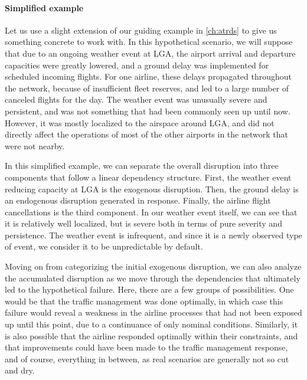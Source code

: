 \paragraph{Simplified example} Let us use a slight extension of our guiding example in \cref{ch:atrds} to give us something concrete to work with. In this hypothetical scenario, we will suppose that due to an ongoing weather event at LGA, the airport arrival and departure capacities were greatly lowered, and a ground delay was implemented for scheduled incoming flights. For one airline, these delays propagated throughout the network, because of insufficient fleet reserves, and led to a large number of canceled flights for the day. The weather event was unusually severe and persistent, and was not something that had been commonly seen up until now. However, it was mostly localized to the airspace around LGA, and did not directly affect the operations of most of the other airports in the network that were not nearby.

In this simplified example, we can separate the overall disruption into three components that follow a linear dependency structure. First, the weather event reducing capacity at LGA is the exogenous disruption. Then, the ground delay is an endogenous disruption generated in response. Finally, the airline flight cancellations is the third component. In our weather event itself, we can see that it is relatively well localized, but is severe both in terms of pure severity and persistence. The weather event is infrequent, and since it is a newly observed type of event, we consider it to be unpredictable by default. 

Moving on from categorizing the initial exogenous disruption, we can also analyze the accumulated disruption as we move through the dependencies that ultimately led to the hypothetical failure. Here, there are a few groups of possibilities. One would be that the traffic management was done optimally, in which case this failure would reveal a weakness in the airline processes that had not been exposed up until this point, due to a continuance of only nominal conditions. Similarly, it is also possible that the airline responded optimally within their constraints, and that improvements could have been made to the traffic management response, and of course, everything in between, as real scenarios are generally not so cut and dry. 

